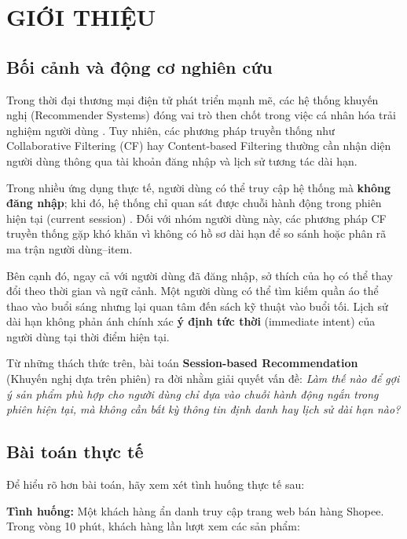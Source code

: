 \documentclass[12pt, a4paper]{article}
\begin{document}
\section{GIỚI THIỆU}
\label{chap:intro}

\subsection{Bối cảnh và động cơ nghiên cứu}

Trong thời đại thương mại điện tử phát triển mạnh mẽ, các hệ thống khuyến nghị (Recommender Systems) đóng vai trò then chốt trong việc cá nhân hóa trải nghiệm người dùng \cite{koren2009, sarwar2001}. Tuy nhiên, các phương pháp truyền thống như Collaborative Filtering (CF) hay Content-based Filtering thường cần nhận diện người dùng thông qua tài khoản đăng nhập và lịch sử tương tác dài hạn.

Trong nhiều ứng dụng thực tế, người dùng có thể truy cập hệ thống mà \textbf{không đăng nhập}; khi đó, hệ thống chỉ quan sát được chuỗi hành động trong phiên hiện tại (current session) \cite{hidasi2016, ludewig2018}. Đối với nhóm người dùng này, các phương pháp CF truyền thống gặp khó khăn vì không có hồ sơ dài hạn để so sánh hoặc phân rã ma trận người dùng--item.

Bên cạnh đó, ngay cả với người dùng đã đăng nhập, sở thích của họ có thể thay đổi theo thời gian và ngữ cảnh. Một người dùng có thể tìm kiếm quần áo thể thao vào buổi sáng nhưng lại quan tâm đến sách kỹ thuật vào buổi tối. Lịch sử dài hạn không phản ánh chính xác \textbf{ý định tức thời} (immediate intent) của người dùng tại thời điểm hiện tại.

Từ những thách thức trên, bài toán \textbf{Session-based Recommendation} (Khuyến nghị dựa trên phiên) ra đời nhằm giải quyết vấn đề: \textit{Làm thế nào để gợi ý sản phẩm phù hợp cho người dùng chỉ dựa vào chuỗi hành động ngắn trong phiên hiện tại, mà không cần bất kỳ thông tin định danh hay lịch sử dài hạn nào?}

\subsection{Bài toán thực tế}

Để hiểu rõ hơn bài toán, hãy xem xét tình huống thực tế sau:

\textbf{Tình huống:} Một khách hàng ẩn danh truy cập trang web bán hàng Shopee. Trong vòng 10 phút, khách hàng lần lượt xem các sản phẩm:
\end{document}
